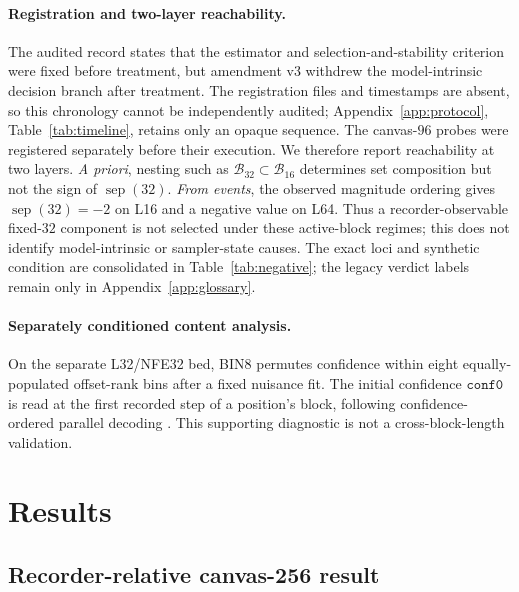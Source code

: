 \documentclass{article}
\begin{document}
\paragraph{Registration and two-layer reachability.}
The audited record states that the estimator and selection-and-stability
criterion were fixed before treatment, but amendment v3 withdrew the
model-intrinsic decision branch after treatment.  The registration files and
timestamps are absent, so this chronology cannot be independently audited;
Appendix~\ref{app:protocol}, Table~\ref{tab:timeline}, retains only an opaque
sequence. The
canvas-$96$ probes were registered separately before their execution. We therefore
report reachability at two layers. \emph{A priori}, nesting such as
$\mathcal B_{32}\subset\mathcal B_{16}$ determines set composition but not the
sign of $\operatorname{sep}(32)$. \emph{From events}, the observed magnitude
ordering gives $\operatorname{sep}(32)=-2$ on L16 and a negative value on L64.
Thus a recorder-observable fixed-$32$ component is not selected under these
active-block regimes; this does not identify model-intrinsic or sampler-state
causes. The exact loci and synthetic condition are consolidated in
Table~\ref{tab:negative}; the legacy verdict labels remain only in
Appendix~\ref{app:glossary}.

\paragraph{Separately conditioned content analysis.}
On the separate L32/NFE32 bed, BIN8 permutes confidence within eight
equally-populated offset-rank bins after a fixed nuisance fit. The initial
confidence $\texttt{conf0}$ is read at the first recorded step of a position's
block, following confidence-ordered parallel decoding
\citep{ghazvininejad2019maskpredict,nie2025large}. This supporting diagnostic is
not a cross-block-length validation.

\section{Results}\label{sec:results}

\subsection{Recorder-relative canvas-256 result}\label{sec:main}
\end{document}
